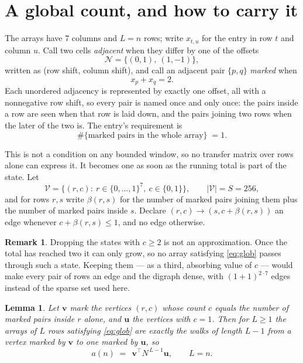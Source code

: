 \documentclass[11pt,a4paper]{article}
\theoremstyle{plain}
\newtheorem{lemma}[theorem]{Lemma}
\theoremstyle{definition}
\newtheorem{remark}[theorem]{Remark}
\begin{document}
\section{A global count, and how to carry it}

The arrays have $7$ columns and $L=n$ rows; write $x_{t,u}$ for the entry in
row $t$ and column $u$. Call two cells \emph{adjacent} when they differ by one of the
offsets
\[
\mathcal N=\{(0,1),\ (1,-1)\},
\]
written as (row shift, column shift), and call an adjacent pair $\{p,q\}$
\emph{marked} when
\[
x_{p}+x_{q}=2 .
\]
Each unordered adjacency is represented by exactly one offset, all with a nonnegative row
shift, so every pair is named once and only once: the pairs inside a row are seen when
that row is laid down, and the pairs joining two rows when the later of the two is. The
entry's requirement is
\begin{equation}\label{eq:glob}
\#\{\text{marked pairs in the whole array}\}\;=1.
\end{equation}

This is not a condition on any bounded window, so no transfer matrix over rows alone can
express it. It becomes one as soon as the running total is part of the state. Let
\[
\mathcal V=\bigl\{(r,c):\ r\in\{0,\dots,1\}^{7},\ c\in\{0,1\}\bigr\},
\qquad |\mathcal V|=S=256,
\]
and for rows $r,s$ write $\beta(r,s)$ for the number of marked pairs joining them plus the
number of marked pairs inside $s$. Declare $(r,c)\to(s,c+\beta(r,s))$ an edge whenever
$c+\beta(r,s)\le1$, and no edge otherwise.

\begin{remark}
Dropping the states with $c\ge2$ is not an approximation. Once the total has reached two it
can only grow, so no array satisfying \eqref{eq:glob} passes through such a state. Keeping
them --- as a third, absorbing value of $c$ --- would make every pair of rows an edge and
the digraph dense, with $(1+1)^{2\cdot7}$ edges instead of the sparse set used here.
\end{remark}

\begin{lemma}\label{lem:walk}
Let $\mathbf{v}$ mark the vertices $(r,c)$ whose count $c$ equals the number of marked pairs
inside $r$ alone, and $\mathbf{u}$ the vertices with $c=1$. Then for $L\ge1$ the arrays
of $L$ rows satisfying \eqref{eq:glob} are exactly the walks of length $L-1$ from a
vertex marked by $\mathbf{v}$ to one marked by $\mathbf{u}$, so
\[
a(n)\;=\;\,\mathbf{v}^{\!\top}N^{\,L-1}\mathbf{u},\qquad L=n .
\]
\end{lemma}
\end{document}
